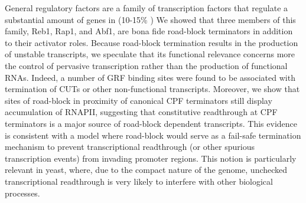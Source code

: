 General regulatory factors are a family of transcription factors that regulate a substantial amount of genes in \cer{} (10-15\% \cite{rhee:2011:comprehensive}) 
We showed that three members of this family, Reb1, Rap1, and Abf1, are bona fide road-block terminators in addition to their activator roles. 
Because road-block termination results in the production of unstable transcripts, we speculate that its functional relevance concerns more the control of pervasive transcription rather than the production of functional RNAs. 
Indeed, a number of GRF binding sites were found to be associated with termination of CUTs or other non-functional transcripts. 
Moreover, we show that sites of road-block in proximity of canonical CPF terminators still display accumulation of RNAPII, suggesting that constitutive readthrough at CPF terminators is a major source of road-block dependent transcripts. 
This evidence is consistent with a model where road-block would serve as a fail-safe termination mechanism to prevent transcriptional readthrough (or other spurious transcription events) from invading promoter regions. 
This notion is particularly relevant in yeast, where, due to the compact nature of the genome, unchecked transcriptional readthrough is very likely to interfere with other biological processes.  



